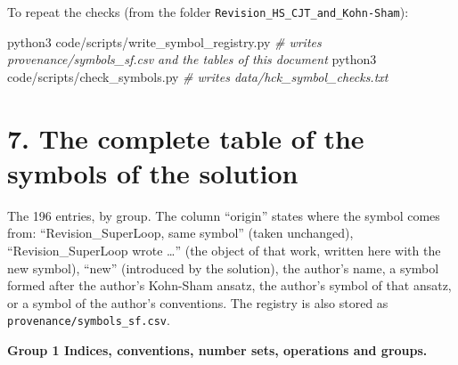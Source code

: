 \documentclass[
  10pt,
]{article}
\newenvironment{Shaded}{}{}
\newcommand{\CommentTok}[1]{\textcolor[rgb]{0.38,0.63,0.69}{\textit{#1}}}
\newcommand{\ExtensionTok}[1]{#1}
\newcommand{\NormalTok}[1]{#1}
\begin{document}
To repeat the checks (from the folder
\texttt{Revision\_HS\_CJT\_and\_Kohn-Sham}):

\begin{Shaded}
\begin{Highlighting}[]
\ExtensionTok{python3}\NormalTok{ code/scripts/write\_symbol\_registry.py   }\CommentTok{\# writes provenance/symbols\_sf.csv and the tables of this document}
\ExtensionTok{python3}\NormalTok{ code/scripts/check\_symbols.py           }\CommentTok{\# writes data/hck\_symbol\_checks.txt}
\end{Highlighting}
\end{Shaded}

\hypertarget{the-complete-table-of-the-symbols-of-the-solution}{%
\section{7. The complete table of the symbols of the
solution}\label{the-complete-table-of-the-symbols-of-the-solution}}

The 196 entries, by group. The column ``origin'' states where the symbol
comes from: ``Revision\_SuperLoop, same symbol'' (taken unchanged),
``Revision\_SuperLoop wrote \ldots{}'' (the object of that work, written
here with the new symbol), ``new'' (introduced by the solution), the
author's name, a symbol formed after the author's Kohn-Sham ansatz, the
author's symbol of that ansatz, or a symbol of the author's conventions.
The registry is also stored as \texttt{provenance/symbols\_sf.csv}.

\textbf{Group 1 Indices, conventions, number sets, operations and
groups.}
\end{document}
